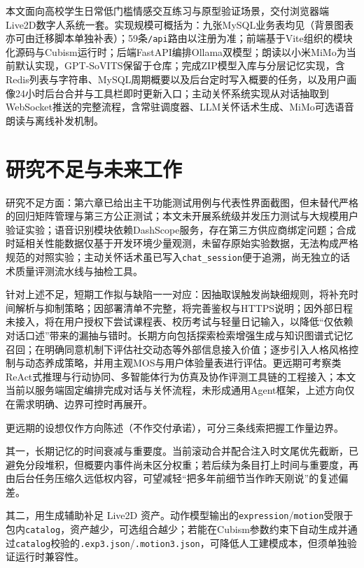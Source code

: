 \documentclass{base}
\begin{document}
本文面向高校学生日常低门槛情感交互练习与原型验证场景，交付浏览器端Live2D数字人系统一套。实现规模可概括为：九张MySQL业务表均见（背景图表亦可由迁移脚本单独补表）；59条\texttt{/api}路由以注册为准；前端基于Vite组织的模块化源码与Cubism运行时；后端FastAPI编排Ollama双模型；朗读以小米MiMo为当前默认实现，GPT-SoVITS保留于仓库；完成ZIP模型入库与分层记忆实现，含Redis列表与字符串、MySQL周期概要以及后台定时写入概要的任务，以及用户画像24小时后台合并与工具栏即时更新入口；主动关怀系统实现从对话抽取到WebSocket推送的完整流程，含常驻调度器、LLM关怀话术生成、MiMo可选语音朗读与离线补发机制。

\section{研究不足与未来工作}

研究不足方面：第六章已给出主干功能测试用例与代表性界面截图，但未替代严格的回归矩阵管理与第三方公正测试；本文未开展系统级并发压力测试与大规模用户验证实验；语音识别模块依赖DashScope服务，存在第三方供应商绑定问题；合成时延相关性能数据仅基于开发环境少量观测，未留存原始实验数据，无法构成严格规范的对照实验；主动关怀话术虽已写入\texttt{chat\_session}便于追溯，尚无独立的话术质量评测流水线与抽检工具。

针对上述不足，短期工作拟与缺陷一一对应：因抽取误触发尚缺细规则，将补充时间解析与抑制策略；因部署清单不完整，将完善鉴权与HTTPS说明；因外部日程未接入，将在用户授权下尝试课程表、校历考试与轻量日记输入，以降低``仅依赖对话口述''带来的漏抽与错时。长期方向包括探索检索增强生成与知识图谱式记忆召回\cite{Lewis2020}；在明确同意机制下评估社交动态等外部信息接入价值；逐步引入人格风格控制与动态养成策略，并用主观MOS与用户体验量表进行评估。更远期可考察类ReAct式推理与行动协同、多智能体行为仿真及协作评测工具链的工程接入；本文当前以服务端固定编排完成对话与关怀流程，未形成通用Agent框架，上述方向仅在需求明确、边界可控时再展开。

更远期的设想仅作方向陈述（不作交付承诺），可分三条线索把握工作量边界。

其一，长期记忆的时间衰减与重要度。当前滚动合并配合注入时文尾优先截断，已避免分段堆积，但概要内事件尚未区分权重；若后续为条目打上时间与重要度，再由后台任务压缩久远低权内容，可望减轻``把多年前细节当作昨天刚说''的复述偏差。

其二，用生成辅助补足 Live2D 资产。动作模型输出的\texttt{expression}/\texttt{motion}受限于包内\texttt{catalog}，资产越少，可选组合越少；若能在Cubism参数约束下自动生成并通过\texttt{catalog}校验的\texttt{.exp3.json}/\texttt{.motion3.json}，可降低人工建模成本，但须单独验证运行时兼容性。
\end{document}
